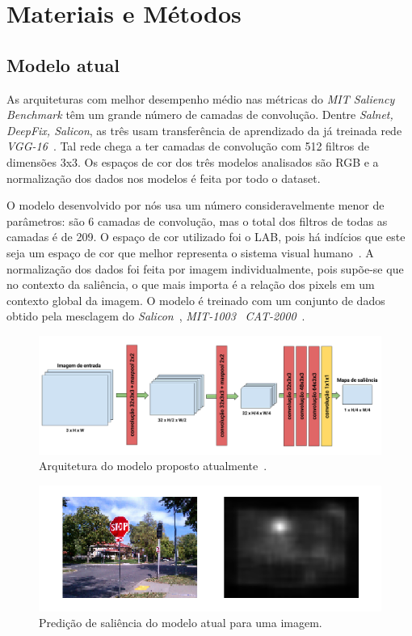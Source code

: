\documentclass[11pt]{article}
\newcommand{\tit}[1]{\textit{#1}}
\begin{document}
\section{Materiais e Métodos}
\subsection{Modelo atual}
As arquiteturas com melhor desempenho médio nas métricas do
\tit{MIT Saliency Benchmark} têm um grande número de camadas de convolução.
Dentre \tit{Salnet, DeepFix, Salicon}, as três usam transferência de
aprendizado da já treinada rede \tit{VGG-16}~\cite{ref:vgg-16}.
Tal rede chega a ter camadas de convolução com 512 filtros de dimensões 3x3.
Os espaços de cor dos três modelos analisados são RGB e a normalização dos
dados nos modelos é feita por todo o dataset.

O modelo desenvolvido por nós usa um número consideravelmente menor de
parâmetros: são 6 camadas de convolução, mas o total dos filtros de todas
as camadas é de 209. O espaço de cor utilizado foi o LAB, pois há indícios
que este seja um espaço de cor que melhor representa o sistema
visual humano~\cite{ref:vocus}.
A normalização dos dados foi feita por imagem
individualmente, pois supõe-se que no contexto da saliência, o que mais
importa é a relação dos pixels em um contexto global da imagem.
O modelo é treinado com um conjunto de dados obtido pela mesclagem do
\tit{Salicon}~\cite{ref:salicon-dataset},
\tit{MIT-1003}~\cite{ref:judd-1003-dataset}
\tit{CAT-2000}~\cite{ref:cat-2000-dataset}.

\begin{figure}[H]
    \hspace*{-0.5in}
    \includegraphics[width=1.2\linewidth]{imgs/att_deep.png}
    \caption{Arquitetura do modelo proposto atualmente~\cite{ref:att-deep}.}
    \label{fig:att-deep-model}
\end{figure}

\begin{figure}[H]
    \centering
    \includegraphics[width=0.7\linewidth]{imgs/our.png}
    \caption{Predição de saliência do modelo atual para uma imagem.}
    \label{fig:att-deep-pred}
\end{figure}
\end{document}
